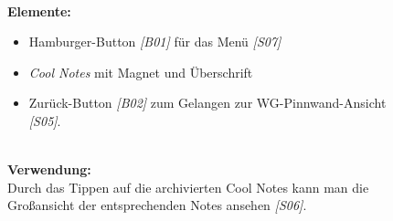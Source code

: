 \documentclass[a4paper]{scrreprt}
\begin{document}
\begin{figure}[h]
\begin{minipage}[b]{0.6\linewidth}
    			\hfill 
    			\\\textbf{Elemente:}
    			\begin{itemize}
    				\renewcommand\labelitemi{--}
    				\item Hamburger-Button \textit{{[}B01{]}} für das Menü \textit{{[}S07{]}}
    				\item \textit{Cool Notes} mit Magnet und Überschrift
    				\item Zurück-Button \textit{{[}B02{]}} zum Gelangen zur
    				WG-Pinnwand-Ansicht \textit{{[}S05{]}}.
    				
    			\end{itemize}
    			
    			\hfill
    			\\
    			
    			\textbf{Verwendung:}\\
    			Durch das Tippen auf die archivierten Cool Notes
    			kann man die Großansicht der entsprechenden
    			Notes ansehen \textit{{[}S06{]}}.
    			
    			\vspace{20mm}
    			
    		\end{minipage}
    	\end{figure}
    	
\end{document}

